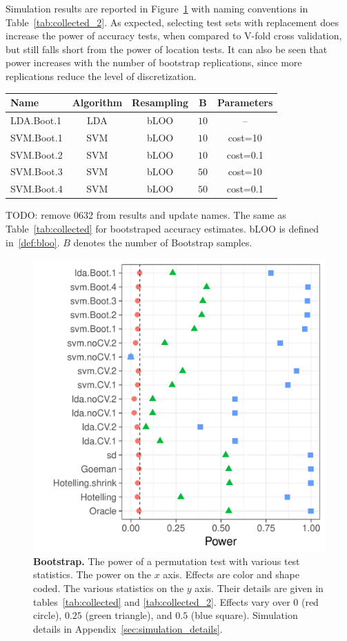 \documentclass[12pt,a4paper]{article}
\begin{document}
Simulation results are reported in Figure~\ref{fig:bootstrap} with naming conventions in Table~\ref{tab:collected_2}.
As expected, selecting test sets with replacement does increase the power of accuracy tests, when compared to V-fold cross validation, but still falls short from the power of location tests. 
It can also be seen that power increases with the number of bootstrap replications, since more replications reduce the level of discretization.

\bigskip

\begin{tcolorbox}
	\centering
	\begin{tabular}{l|c|c|c|c}
		Name & Algorithm & Resampling & B  & Parameters\\ 
		\hline
		\hline
		LDA.Boot.1 & LDA & bLOO 	& $10$ &  -- \\ 
		SVM.Boot.1 & SVM & bLOO 	& $10$ & cost=10 \\ 
		SVM.Boot.2 & SVM & bLOO 	& $10$ & cost=0.1 \\ 
		SVM.Boot.3 & SVM & bLOO 	& $50$ & cost=10 \\ 
		SVM.Boot.4 & SVM & bLOO 	& $50$ & cost=0.1 \\ 
	\end{tabular} 
	\captionsetup{type=table}
	\caption{
		TODO: remove 0632 from results and update names.
		The same as Table~\ref{tab:collected} for bootstraped accuracy estimates. 
		bLOO is defined in~\ref{def:bloo}.
		$B$ denotes the number of Bootstrap samples. } 
	\label{tab:collected_2}
\end{tcolorbox}


\begin{figure}[ht]
	\centering
	\includegraphics[width=0.5\linewidth]{"art/file13"}
	\caption{
		\textbf{Bootstrap.}
		The power of a permutation test with various test statistics. 
		The power on the $x$ axis. 
		Effects are color and shape coded. 
		The various statistics on the $y$ axis. 
		Their details are given in tables~\ref{tab:collected} and \ref{tab:collected_2}. 
		Effects vary over $0$ (red circle), $0.25$ (green triangle), and $0.5$ (blue square). 
		Simulation details in Appendix~\ref{sec:simulation_details}.
	} 
	\label{fig:bootstrap}
\end{figure}
\end{document}
